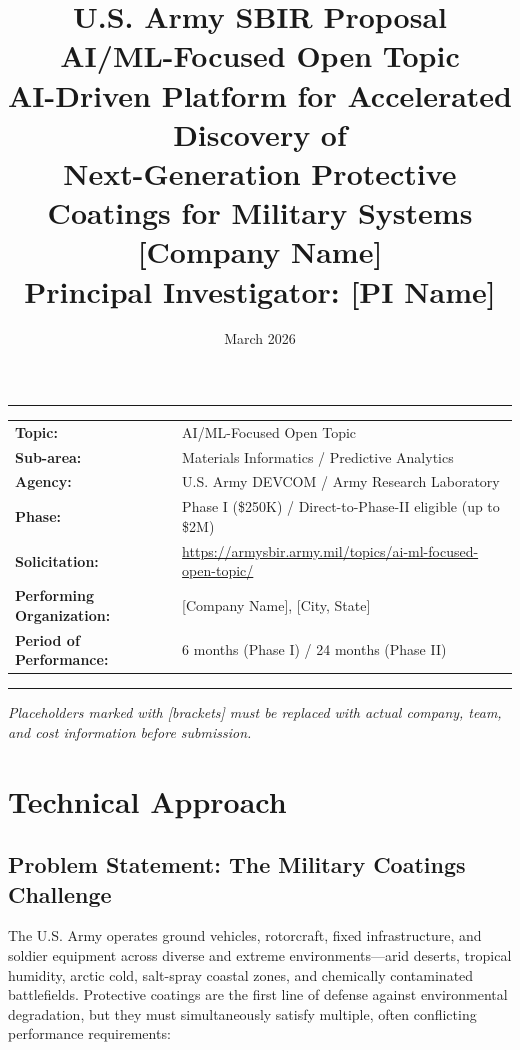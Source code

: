 \documentclass[11pt,letterpaper]{article}
\title{%
  \vspace{-1cm}
  \textcolor{armygreen}{\Large\textbf{U.S. Army SBIR Proposal}}\\[0.2cm]
  \textcolor{armygreen}{\large AI/ML-Focused Open Topic}\\[0.3cm]
  \textbf{AI-Driven Platform for Accelerated Discovery of\\Next-Generation Protective Coatings for Military Systems}\\[0.3cm]
  \large [Company Name]\\[0.2cm]
  \normalsize Principal Investigator: [PI Name]
}
\author{}
\date{March 2026}
\begin{document}
\maketitle
\thispagestyle{fancy}

\noindent\textcolor{armygreen}{\rule{\textwidth}{1.5pt}}

\vspace{0.3cm}

\begin{center}
\begin{tabular}{ll}
\textbf{Topic:} & AI/ML-Focused Open Topic \\
\textbf{Sub-area:} & Materials Informatics / Predictive Analytics \\
\textbf{Agency:} & U.S. Army DEVCOM / Army Research Laboratory \\
\textbf{Phase:} & Phase I (\$250K) / Direct-to-Phase-II eligible (up to \$2M) \\
\textbf{Solicitation:} & \url{https://armysbir.army.mil/topics/ai-ml-focused-open-topic/} \\
\textbf{Performing Organization:} & [Company Name], [City, State] \\
\textbf{Period of Performance:} & 6 months (Phase I) / 24 months (Phase II) \\
\end{tabular}
\end{center}

\vspace{0.3cm}
\noindent\textcolor{armygreen}{\rule{\textwidth}{1.5pt}}

\vspace{0.3cm}
\noindent\textit{Placeholders marked with [brackets] must be replaced with actual company, team, and cost information before submission.}

\section{Technical Approach}
\label{sec:technical_approach}

\subsection{Problem Statement: The Military Coatings Challenge}

The U.S. Army operates ground vehicles, rotorcraft, fixed infrastructure, and soldier equipment across diverse and extreme environments---arid deserts, tropical humidity, arctic cold, salt-spray coastal zones, and chemically contaminated battlefields. Protective coatings are the first line of defense against environmental degradation, but they must simultaneously satisfy multiple, often conflicting performance requirements:
\end{document}
